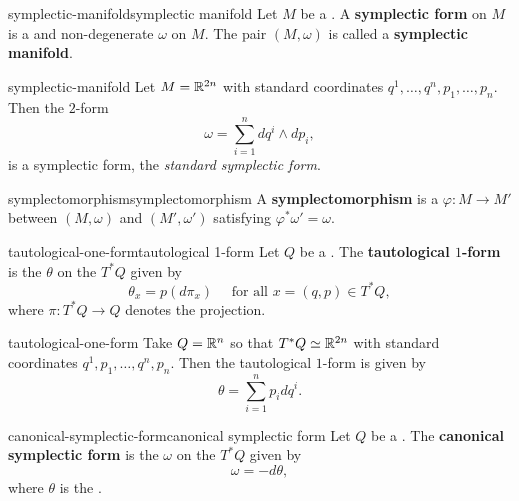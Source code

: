 \begin{topic}{symplectic-manifold}{symplectic manifold}
    Let $M$ be a . A \textbf{symplectic form} on $M$ is a  and non-degenerate  $\omega$ on $M$. The pair $(M, \omega)$ is called a \textbf{symplectic manifold}.
\end{topic}

\begin{example}{symplectic-manifold}
    Let $M = \mathbb{R}^{2n}$ with standard coordinates $q^1, \ldots, q^n, p_1, \ldots, p_n$. Then the $2$-form
    \[ \omega = \sum_{i = 1}^{n} d q^i \wedge d p_i , \]
    is a symplectic form, the \textit{standard symplectic form}.
\end{example}

\begin{topic}{symplectomorphism}{symplectomorphism}
    A \textbf{symplectomorphism} is a  $\varphi : M \to M'$ between  $(M, \omega)$ and $(M', \omega')$ satisfying $\varphi^* \omega' = \omega$.
\end{topic}

\begin{topic}{tautological-one-form}{tautological 1-form}
    Let $Q$ be a . The \textbf{tautological $1$-form} is the  $\theta$ on the  $T^*Q$ given by
    \[ \theta_x = p(d \pi_x) \quad \text{ for all } x = (q, p) \in T^*Q , \]
    where $\pi : T^*Q \to Q$ denotes the projection.
\end{topic}

\begin{example}{tautological-one-form}
    Take $Q = \mathbb{R}^n$ so that $T^* Q \simeq \mathbb{R}^{2n}$ with standard coordinates $q^1, p_1, \ldots, q^n, p_n$. Then the tautological $1$-form is given by
    \[ \theta = \sum_{i = 1}^{n} p_i dq^i . \]
\end{example}

\begin{topic}{canonical-symplectic-form}{canonical symplectic form}
    Let $Q$ be a . The \textbf{canonical symplectic form} is the  $\omega$ on the  $T^* Q$ given by
    \[ \omega = -d \theta , \]
    where $\theta$ is the .
\end{topic}

